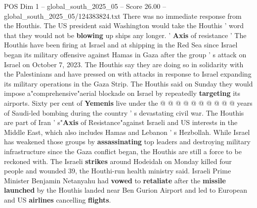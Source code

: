 \begin{textsample}{POS Dim 1 – global\_south\_2025\_05 – Score 26.00 – global\_south\_2025\_05/124383824.txt}
There was no immediate response from the Houthis.
The US president said Washington would take the Houthis ' word that they would not be \textbf{blowing} up ships any longer. ' \textbf{Axis} of resistance ' The Houthis have been firing at Israel and at shipping in the Red Sea since Israel began its military offensive against Hamas in Gaza after the group ' s attack on Israel on October 7, 2023.
The Houthis say they are doing so in solidarity with the Palestinians and have pressed on with attacks in response to Israel expanding its military operations in the Gaza Strip.
The Houthis said on Sunday they would impose a"comprehensive"aerial blockade on Israel by repeatedly \textbf{targeting} its airports.
Sixty per cent of \textbf{Yemenis} live under the @ @ @ @ @ @ @ @ @ @ years of Saudi-led bombing during the country ' s devastating civil war.
The Houthis are part of Iran ' s"\textbf{Axis} of Resistance"against Israeli and US interests in the Middle East, which also includes Hamas and Lebanon ' s Hezbollah.
While Israel has weakened those groups by \textbf{assassinating} top leaders and destroying military infrastructure since the Gaza conflict began, the Houthis are still a force to be reckoned with.
The Israeli \textbf{strikes} around Hodeidah on Monday killed four people and wounded 39, the Houthi-run health ministry said.
Israeli Prime Minister Benjamin Netanyahu had \textbf{vowed} to \textbf{retaliate} after the \textbf{missile} \textbf{launched} by the Houthis landed near Ben Gurion Airport and led to European and US \textbf{airlines} cancelling \textbf{flights}.

\end{textsample}
